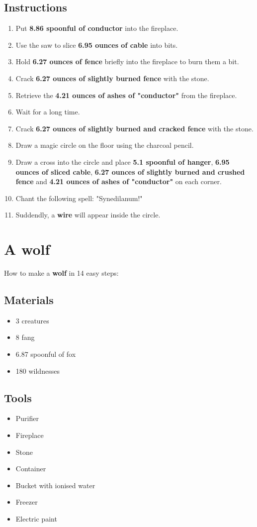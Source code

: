 \documentclass{article}
\begin{document}
\subsection{Instructions}\begin{enumerate}
\item 
Put \textbf{8.86 spoonful of conductor} into the fireplace.
\item 
Use the saw to slice \textbf{6.95 ounces of cable} into bits.
\item 
Hold \textbf{6.27 ounces of fence} briefly into the fireplace to burn them a bit.
\item 
Crack \textbf{6.27 ounces of slightly burned fence} with the stone.
\item 
Retrieve the \textbf{4.21 ounces of ashes of "conductor"} from the fireplace.
\item 
Wait for a long time.
\item 
Crack \textbf{6.27 ounces of slightly burned and cracked fence} with the stone.
\item 
Draw a magic circle on the floor using the charcoal pencil.
\item 
Draw a cross into the circle and place \textbf{5.1 spoonful of hanger}, \textbf{6.95 ounces of sliced cable}, \textbf{6.27 ounces of slightly burned and crushed fence} and \textbf{4.21 ounces of ashes of "conductor"} on each corner.
\item 
Chant the following spell: "Synedilanum!"
\item 
Suddendly, a \textbf{wire} will appear inside the circle.
\end{enumerate}
\newpage
\section{A wolf}How to make a \textbf{wolf} in 14 easy steps:

\subsection{Materials}\begin{itemize}
\item 
3 creatures
\item 
8 fang
\item 
6.87 spoonful of fox
\item 
180 wildnesses
\end{itemize}
\subsection{Tools}\begin{itemize}
\item 
Purifier
\item 
Fireplace
\item 
Stone
\item 
Container
\item 
Bucket with ionised water
\item 
Freezer
\item 
Electric paint
\end{itemize}
\end{document}
